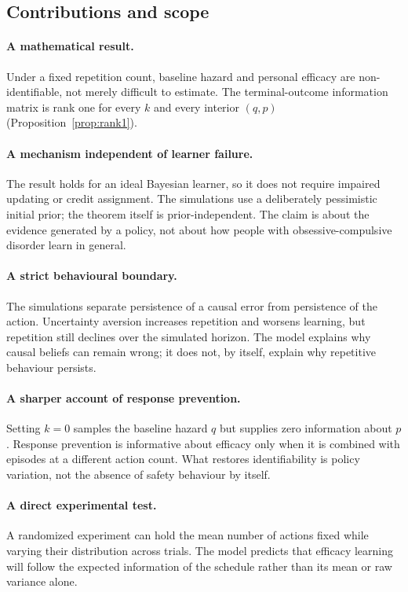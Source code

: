 \documentclass[11pt]{article}
\begin{document}
\subsection{Contributions and scope}

\paragraph{A mathematical result.} Under a fixed repetition count, baseline
hazard and personal efficacy are non-identifiable, not merely difficult to
estimate. The terminal-outcome information matrix is rank one for every $k$ and
every interior $(q,p)$ (Proposition~\ref{prop:rank1}).

\paragraph{A mechanism independent of learner failure.} The result holds for an
ideal Bayesian learner, so it does not require impaired updating or credit
assignment. The simulations use a deliberately pessimistic initial prior; the
theorem itself is prior-independent. The claim is about the evidence generated
by a policy, not about how people with obsessive-compulsive disorder learn in
general.

\paragraph{A strict behavioural boundary.} The simulations separate persistence
of a causal error from persistence of the action. Uncertainty aversion increases
repetition and worsens learning, but repetition still declines over the simulated
horizon. The model explains why causal beliefs can remain wrong; it does not, by
itself, explain why repetitive behaviour persists.

\paragraph{A sharper account of response prevention.} Setting $k=0$ samples the
baseline hazard $q$ but supplies zero information about $p$. Response prevention
is informative about efficacy only when it is combined with episodes at a
different action count. What restores identifiability is policy variation, not
the absence of safety behaviour by itself.

\paragraph{A direct experimental test.} A randomized experiment can hold the
mean number of actions fixed while varying their distribution across trials. The
model predicts that efficacy learning will follow the expected information of the
schedule rather than its mean or raw variance alone.
\end{document}
